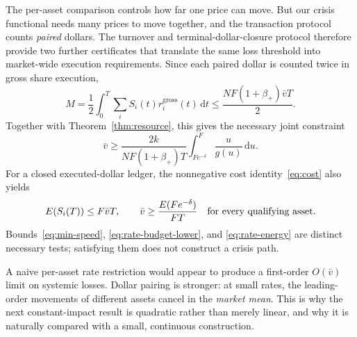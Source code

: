 \documentclass[11pt]{article}
\numberwithin{equation}{section}
\theoremstyle{definition}
\theoremstyle{remark}
\newcommand{\dd}{\,\mathrm{d}}
\begin{document}
The per-asset comparison controls how far one price can move. But our crisis functional needs many prices to move together, and the transaction protocol counts \emph{paired} dollars. The turnover and terminal-dollar-closure protocol therefore provide two further certificates that translate the same loss threshold into market-wide execution requirements. Since each paired dollar is counted twice in gross share execution,
\begin{equation}\label{eq:rate-turnover}
 M=\frac12\int_0^T\sum_i S_i(t)r_i^{\mathrm{gross}}(t)\dd t
 \le\frac{NF(1+\beta_+)\bar v T}{2}.
\end{equation}
Together with Theorem~\ref{thm:resource}, this gives the necessary joint constraint
\begin{equation}\label{eq:rate-budget-lower}
 \boxed{\ \bar v\ge\frac{2k}{NF(1+\beta_+)T}
 \int_{Fe^{-\delta}}^F\frac{u}{g(u)}\dd u.\ }
\end{equation}
For a closed executed-dollar ledger, the nonnegative cost identity~\eqref{eq:cost} also yields
\begin{equation}\label{eq:rate-energy}
 E(S_i(T))\le F\bar v T,\qquad
 \bar v\ge \frac{E(Fe^{-\delta})}{FT}
 \quad \hbox{for every qualifying asset.}
\end{equation}
Bounds~\eqref{eq:min-speed}, \eqref{eq:rate-budget-lower}, and \eqref{eq:rate-energy} are distinct necessary tests; satisfying them does not construct a crisis path.

A naive per-asset rate restriction would appear to produce a first-order $O(\bar v)$ limit on systemic losses. Dollar pairing is stronger: at small rates, the leading-order movements of different assets cancel in the \emph{market mean}. This is why the next constant-impact result is quadratic rather than merely linear, and why it is naturally compared with a small, continuous construction.
\end{document}
